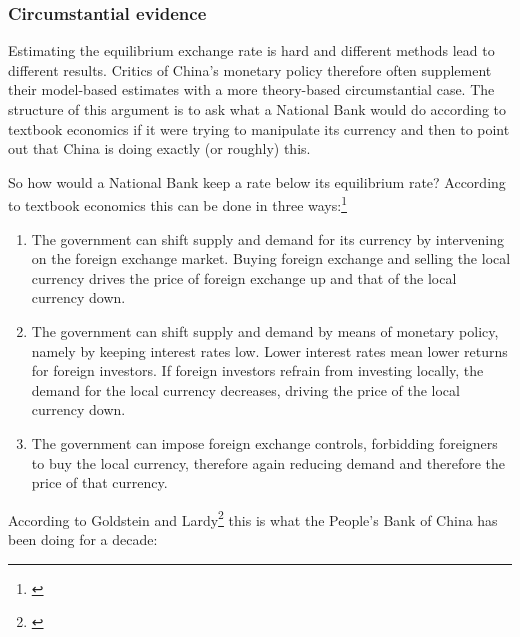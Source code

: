 \documentclass[11pt]{article}
\begin{document}

\subsubsection{Circumstantial evidence}

Estimating the equilibrium exchange rate is hard and different methods lead to different results. Critics of China's monetary policy therefore often supplement their model-based estimates with a more theory-based circumstantial case. The structure of this argument is to ask what a National Bank would do according to textbook economics if it were trying to manipulate its currency and then to point out that China is doing exactly (or roughly) this. 


So how would a National Bank keep a rate below its equilibrium rate? According to 
textbook economics this can be done in three ways:\footnote{\cite[pp. 
514]{Krugman2008}}

\begin{enumerate}
\item{The government can shift supply and demand for its currency by intervening on the foreign exchange market. Buying foreign exchange and selling the local currency drives the price of foreign exchange up and that of the local currency down.}
\item{The government can shift supply and demand by means of monetary policy, namely by keeping interest rates low. Lower interest rates mean lower returns for foreign investors. If foreign investors refrain from investing locally, the demand for the local currency decreases, driving the price of the local currency down.}
\item{The government can impose foreign exchange controls, forbidding foreigners to buy the local currency, therefore again reducing demand and therefore the price of that currency.}
\end{enumerate}

According to Goldstein and Lardy\footnote{\cite[pp.  
40]{GoldsteinLardy2008}}  this is what the People's Bank of China has been doing for a decade:
\end{document}
